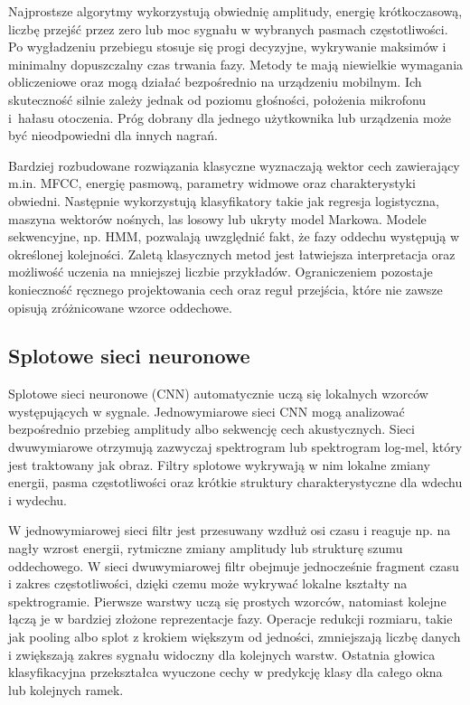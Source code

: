 Najprostsze algorytmy wykorzystują obwiednię amplitudy, energię krótkoczasową, liczbę przejść przez zero lub moc sygnału w wybranych pasmach częstotliwości. Po wygładzeniu przebiegu stosuje się progi decyzyjne, wykrywanie maksimów i minimalny dopuszczalny czas trwania fazy. Metody te mają niewielkie wymagania obliczeniowe oraz mogą działać bezpośrednio na urządzeniu mobilnym. Ich skuteczność silnie zależy jednak od poziomu głośności, położenia mikrofonu i~hałasu otoczenia. Próg dobrany dla jednego użytkownika lub urządzenia może być nieodpowiedni dla innych nagrań.

Bardziej rozbudowane rozwiązania klasyczne wyznaczają wektor cech zawierający m.in. MFCC, energię pasmową, parametry widmowe oraz charakterystyki obwiedni. Następnie wykorzystują klasyfikatory takie jak regresja logistyczna, maszyna wektorów nośnych, las losowy lub ukryty model Markowa. Modele sekwencyjne, np. HMM, pozwalają uwzględnić fakt, że fazy oddechu występują w określonej kolejności. Zaletą klasycznych metod jest łatwiejsza interpretacja oraz możliwość uczenia na mniejszej liczbie przykładów. Ograniczeniem pozostaje konieczność ręcznego projektowania cech oraz reguł przejścia, które nie zawsze opisują zróżnicowane wzorce oddechowe.

\subsection{Splotowe sieci neuronowe}

Splotowe sieci neuronowe (CNN) automatycznie uczą się lokalnych wzorców występujących w sygnale. Jednowymiarowe sieci CNN mogą analizować bezpośrednio przebieg amplitudy albo sekwencję cech akustycznych. Sieci dwuwymiarowe otrzymują zazwyczaj spektrogram lub spektrogram log-mel, który jest traktowany jak obraz. Filtry splotowe wykrywają w nim lokalne zmiany energii, pasma częstotliwości oraz krótkie struktury charakterystyczne dla wdechu i wydechu.

W jednowymiarowej sieci filtr jest przesuwany wzdłuż osi czasu i reaguje np. na nagły wzrost energii, rytmiczne zmiany amplitudy lub strukturę szumu oddechowego. W sieci dwuwymiarowej filtr obejmuje jednocześnie fragment czasu i zakres częstotliwości, dzięki czemu może wykrywać lokalne kształty na spektrogramie. Pierwsze warstwy uczą się prostych wzorców, natomiast kolejne łączą je w bardziej złożone reprezentacje fazy. Operacje redukcji rozmiaru, takie jak pooling albo splot z krokiem większym od jedności, zmniejszają liczbę danych i zwiększają zakres sygnału widoczny dla kolejnych warstw. Ostatnia głowica klasyfikacyjna przekształca wyuczone cechy w predykcję klasy dla całego okna lub kolejnych ramek.

